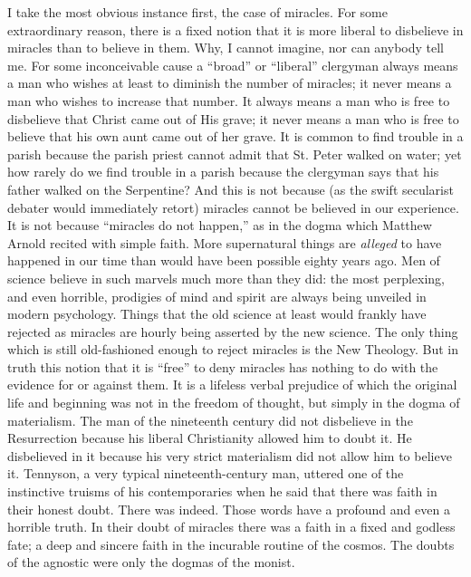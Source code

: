 \documentclass{book}
\begin{document}
I take the most obvious instance first, the case of miracles. For some extraordinary reason, there is a fixed notion that it is more liberal to disbelieve in miracles than to believe in them. Why, I cannot imagine, nor can anybody tell me. For some inconceivable cause a “broad” or “liberal” clergyman always means a man who wishes at least to diminish the number of miracles; it never means a man who wishes to increase that number. It always means a man who is free to disbelieve that Christ came out of His grave; it never means a man who is free to believe that his own aunt came out of her grave. It is common to find trouble in a parish because the parish priest cannot admit that St. Peter walked on water; yet how rarely do we find trouble in a parish because the clergyman says that his father walked on the Serpentine? And this is not because (as the swift secularist debater would immediately retort) miracles cannot be believed in our experience. It is not because “miracles do not happen,” as in the dogma which Matthew Arnold recited with simple faith. More supernatural things are \emph{alleged} to have happened in our time than would have been possible eighty years ago. Men of science believe in such marvels much more than they did: the most perplexing, and even horrible, prodigies of mind and spirit are always being unveiled in modern psychology. Things that the old science at least would frankly have rejected as miracles are hourly being asserted by the new science. The only thing which is still old-fashioned enough to reject miracles is the New Theology. But in truth this notion that it is “free” to deny miracles has nothing to do with the evidence for or against them. It is a lifeless verbal prejudice of which the original life and beginning was not in the freedom of thought, but simply in the dogma of materialism. The man of the nineteenth century did not disbelieve in the Resurrection because his liberal Christianity allowed him to doubt it. He disbelieved in it because his very strict materialism did not allow him to believe it. Tennyson, a very typical nineteenth-century man, uttered one of the instinctive truisms of his contemporaries when he said that there was faith in their honest doubt. There was indeed. Those words have a profound and even a horrible truth. In their doubt of miracles there was a faith in a fixed and godless fate; a deep and sincere faith in the incurable routine of the cosmos. The doubts of the agnostic were only the dogmas of the monist.
\end{document}

